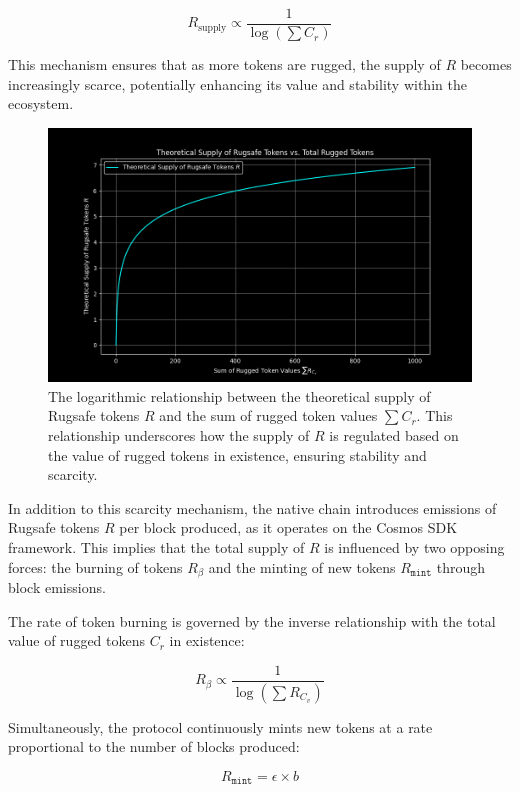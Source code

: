 \documentclass{article}
\begin{document}
\begin{equation}
R_\text{supply}  \propto \frac{1}{\log\left(\sum C_r\right)}
\end{equation}

This mechanism ensures that as more tokens are rugged, the supply of $R$ becomes increasingly scarce, potentially enhancing its value and stability within the ecosystem.

\begin{figure}[h]
\centering
\includegraphics[width=\textwidth]{images/5.png}
\caption{The logarithmic relationship between the theoretical supply of Rugsafe tokens $R$ and the sum of rugged token values $\sum C_r$. This relationship underscores how the supply of $R$ is regulated based on the value of rugged tokens in existence, ensuring stability and scarcity.}
\label{fig:minted_anticoins}
\end{figure}

In addition to this scarcity mechanism, the native chain introduces emissions of Rugsafe tokens $R$ per block produced, as it operates on the Cosmos SDK framework. This implies that the total supply of $R$ is influenced by two opposing forces: the burning of tokens $R_\beta$ and the minting of new tokens $R_\texttt{mint}$ through block emissions.

The rate of token burning is governed by the inverse relationship with the total value of rugged tokens $C_r$ in existence:

\[
R_{\beta} \propto \frac{1}{\log\left(\sum R_{C_v}\right)}
\]

Simultaneously, the protocol continuously mints new tokens at a rate proportional to the number of blocks produced:

\[
R_{\texttt{mint}} = \epsilon \times b
\]
\end{document}
